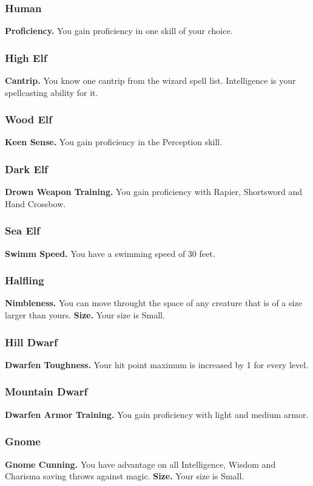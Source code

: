 \documentclass[a4paper,10pt,twoside,twocolumn]{dndbook} %
\begin{document}
	\subsubsection{Human}
	\textbf{Proficiency.} You gain proficiency in one skill of your choice.
	\subsubsection{High Elf}
	\textbf{Cantrip.} You know one cantrip from the wizard spell list. Intelligence is your spellcasting ability for it.
	\subsubsection{Wood Elf}
	\textbf{Keen Sense.} You gain proficiency in the Perception skill.
	\subsubsection{Dark Elf}
	\textbf{Drown Weapon Training.} You gain proficiency with Rapier, Shortsword and Hand Crossbow.
	\subsubsection{Sea Elf}
	\textbf{Swimm Speed.} You have a swimming speed of 30 feet.
	\subsubsection{Halfling}
	\textbf{Nimbleness.} You can move throught the space of any creature that is of a size larger than yours.\linebreak
	\textbf{Size.} Your size is Small.
	\subsubsection{Hill Dwarf}
	\textbf{Dwarfen Toughness.} Your hit point maximum is increased by 1 for every level.
	\subsubsection{Mountain Dwarf}
	\textbf{Dwarfen Armor Training.} You gain proficiency with light and medium armor.
	\subsubsection{Gnome}
	\textbf{Gnome Cunning.} You have advantage on all Intelligence, Wisdom and Charisma saving throws against magic.\linebreak
	\textbf{Size.} Your size is Small.
\end{document}
